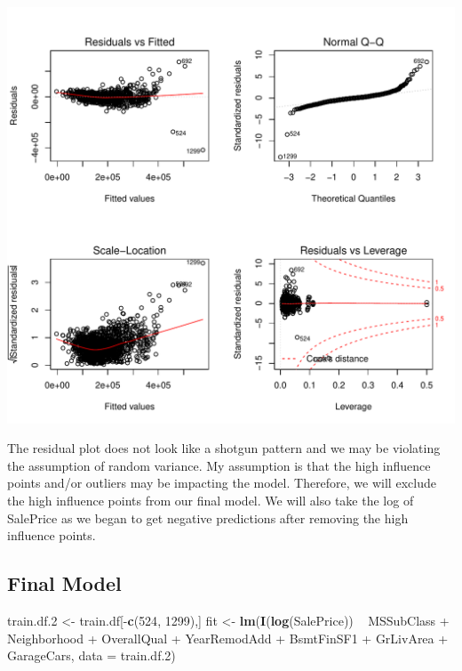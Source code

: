 \documentclass[]{article}
\newenvironment{Shaded}{\begin{snugshade}}{\end{snugshade}}
\newcommand{\KeywordTok}[1]{\textcolor[rgb]{0.13,0.29,0.53}{\textbf{{#1}}}}
\newcommand{\DataTypeTok}[1]{\textcolor[rgb]{0.13,0.29,0.53}{{#1}}}
\newcommand{\DecValTok}[1]{\textcolor[rgb]{0.00,0.00,0.81}{{#1}}}
\newcommand{\FloatTok}[1]{\textcolor[rgb]{0.00,0.00,0.81}{{#1}}}
\newcommand{\StringTok}[1]{\textcolor[rgb]{0.31,0.60,0.02}{{#1}}}
\newcommand{\NormalTok}[1]{{#1}}
\begin{document}
\includegraphics{Final_Project_files/figure-latex/unnamed-chunk-22-1.pdf}

The residual plot does not look like a shotgun pattern and we may be
violating the assumption of random variance. My assumption is that the
high influence points and/or outliers may be impacting the model.
Therefore, we will exclude the high influence points from our final
model. We will also take the log of SalePrice as we began to get
negative predictions after removing the high influence points.

\newpage

\subsection{Final Model}\label{final-model}

\begin{Shaded}
\begin{Highlighting}[]
\NormalTok{train.df}\FloatTok{.2} \NormalTok{<-}\StringTok{ }\NormalTok{train.df[-}\KeywordTok{c}\NormalTok{(}\DecValTok{524}\NormalTok{, }\DecValTok{1299}\NormalTok{),]}
\NormalTok{fit <-}\StringTok{ }\KeywordTok{lm}\NormalTok{(}\KeywordTok{I}\NormalTok{(}\KeywordTok{log}\NormalTok{(SalePrice)) ~}\StringTok{ }\NormalTok{MSSubClass +}\StringTok{ }\NormalTok{Neighborhood +}\StringTok{ }
\StringTok{            }\NormalTok{OverallQual +}\StringTok{ }\NormalTok{YearRemodAdd +}\StringTok{ }\NormalTok{BsmtFinSF1 +}\StringTok{ }
\StringTok{            }\NormalTok{GrLivArea +}\StringTok{ }\NormalTok{GarageCars, }\DataTypeTok{data =} \NormalTok{train.df}\FloatTok{.2}\NormalTok{)}
\end{Highlighting}
\end{Shaded}
\end{document}

